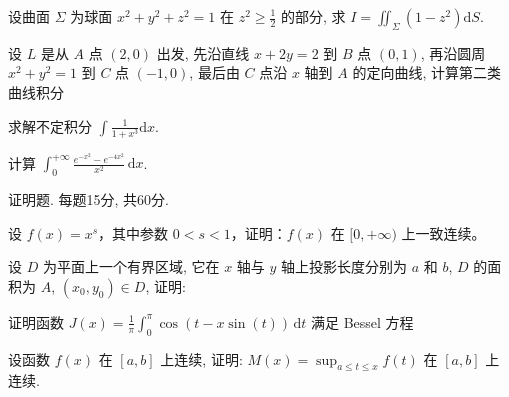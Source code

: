 设曲面 $\Sigma$ 为球面 $x^{2} + y^{2} + z^{2} = 1$ 在 $z^{2} \geq \frac{1}{2}$ 的部分, 求 $I = \iint_{\Sigma} (1 - z^{2}) \mathrm{d}S$.\par
\par{}
设 $L$ 是从 $A$ 点 $(2,0)$ 出发, 先沿直线 $x + 2y = 2$ 到 $B$ 点 $(0,1)$, 再沿圆周 $x^{2} + y^{2} = 1$ 到 $C$ 点 $(-1,0)$, 最后由 $C$ 点沿 $x$ 轴到 $A$ 的定向曲线, 计算第二类曲线积分\par
\nopagebreak[4]
求解不定积分 $\int \frac{1}{1 + x^3} \mathrm{d}x$.\par
计算 $\int_0^{+\infty} \frac{e^{-x^2} - e^{-4x^2}}{x^2} \, \mathrm{d}x$.\par
\par{}
证明题. 每题15分, 共60分.\par
设 $f(x) = x^s$，其中参数 $0 < s < 1$，证明：$f(x)$ 在 $[0, +\infty)$ 上一致连续。\par
\par{}
设 $D$ 为平面上一个有界区域, 它在 $x$ 轴与 $y$ 轴上投影长度分别为 $a$ 和 $b$, $D$ 的面积为 $A$, $(x_0, y_0) \in D$, 证明:\par
\nopagebreak[4]
\par{}
证明函数 $J(x) = \frac{1}{\pi} \int_{0}^{\pi} \cos(t - x \sin(t)) \, \mathrm{d}t$ 满足 Bessel 方程\par
\nopagebreak[4]
设函数 $f(x)$ 在 $[a, b]$ 上连续, 证明: $M(x) = \sup_{a \leq t \leq x} f(t)$ 在 $[a, b]$ 上连续.\par
